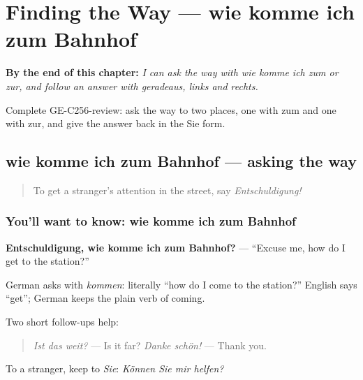 
\chapter{Finding the Way — wie komme ich zum Bahnhof}
\label{ch:ge-finding-the-way}

\begin{chapteropening}
\textbf{By the end of this chapter:} \emph{I can ask the way with wie komme ich zum or zur, and follow an answer with geradeaus, links and rechts.}

Complete GE-C256-review: ask the way to two places, one with zum and one with zur, and give the answer back in the Sie form.
\end{chapteropening}

\section[wie komme ich zum Bahnhof]{wie komme ich zum Bahnhof — asking the way}

\label{lesson:GE-C256-wie-komme-ich}



\begin{quote}
To get a stranger's attention in the street, say \emph{Entschuldigung!}
\end{quote}

\subsection*{You'll want to know: wie komme ich zum Bahnhof}
\textbf{Entschuldigung, wie komme ich zum Bahnhof?} — \textquotedblleft{}Excuse me, how do I get to the station?\textquotedblright{}

German asks with \emph{kommen}: literally \textquotedblleft{}how do I come to the station?\textquotedblright{} English says \textquotedblleft{}get\textquotedblright{}; German keeps the plain verb of coming.

Two short follow-ups help:

\begin{quote}
\emph{Ist das weit?} — Is it far? \emph{Danke schön!} — Thank you.
\end{quote}

To a stranger, keep to \emph{Sie}: \emph{Können Sie mir helfen?}

